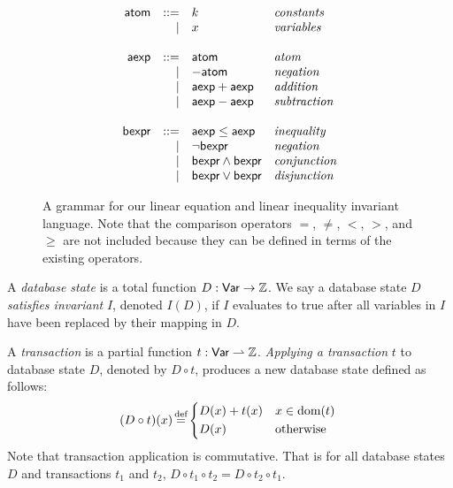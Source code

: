 \begin{figure}[h]
  \centering

  \newcommand{\atom}{\textsf{atom}}
  \newcommand{\aexp}{\textsf{aexp}}
  \newcommand{\bexp}{\textsf{bexpr}}
  \begin{gather*}
    \begin{array}{rrll}
      \atom & ::= & k & \text{\emph{constants}} \\
            & |   & x & \text{\emph{variables}} \\
      &&& \\
      \aexp  & ::= & \atom         & \text{\emph{atom}} \\
             & |   & -\atom        & \text{\emph{negation}} \\
             & |   & \aexp + \aexp & \text{\emph{addition}} \\
             & |   & \aexp - \aexp & \text{\emph{subtraction}} \\
      &&& \\
      \bexp  & ::= & \aexp \leq \aexp  & \text{\emph{inequality}} \\
             & |   & \lnot \bexp       & \text{\emph{negation}} \\
             & |   & \bexp \land \bexp & \text{\emph{conjunction}} \\
             & |   & \bexp \lor \bexp  & \text{\emph{disjunction}} \\
    \end{array}
  \end{gather*}

  \caption{
    A grammar for our linear equation and linear inequality invariant language.
    Note that the comparison operators $=$, $\neq$, $<$, $>$, and $\geq$ are
    not included because they can be defined in terms of the existing
    operators.
  }
  \label{fig:invariant-grammar}
\end{figure}

A \emph{database state} is a total function $D: \textsf{Var} \to \mathbb{Z}$.  We say a
database state $D$ \emph{satisfies invariant} $I$, denoted $I(D)$, if $I$
evaluates to true after all variables in $I$ have been replaced by their
mapping in $D$.

A \emph{transaction} is a partial function $t: \textsf{Var} \rightharpoonup \mathbb{Z}$.
\emph{Applying a transaction} $t$ to database state $D$, denoted by $D \circ
t$, produces a new database state defined as follows:
\[
  (D \circ t)(x) \defeq \begin{cases*}
    D(x) + t(x) & $x \in \dom{}(t)$ \\
    D(x)        & otherwise
  \end{cases*}
\]
Note that transaction application is commutative. That is for all database
states $D$ and transactions $t_1$ and $t_2$, $D \circ t_1 \circ t_2 = D \circ
t_2 \circ t_1$.

